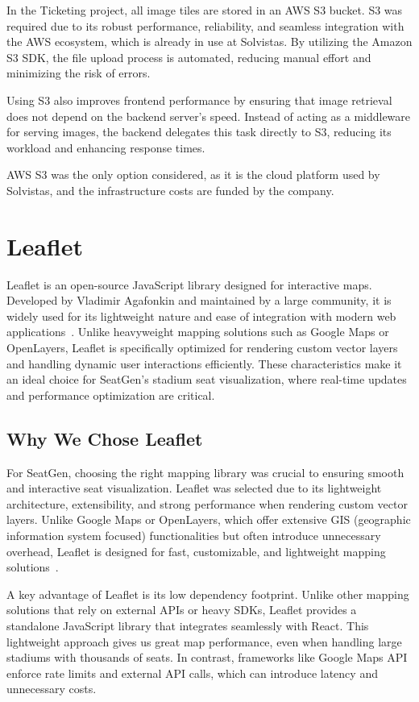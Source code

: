 In the Ticketing project, all image tiles are stored in an AWS S3 bucket. S3 was required due to its robust performance, reliability, and seamless integration with the AWS ecosystem, which is already in use at Solvistas. By utilizing the Amazon S3 SDK, the file upload process is automated, reducing manual effort and minimizing the risk of errors.

Using S3 also improves frontend performance by ensuring that image retrieval does not depend on the backend server’s speed. Instead of acting as a middleware for serving images, the backend delegates this task directly to S3, reducing its workload and enhancing response times.

AWS S3 was the only option considered, as it is the cloud platform used by Solvistas, and the infrastructure costs are funded by the company.

\section{Leaflet}
Leaflet is an open-source JavaScript library designed for interactive maps. Developed by Vladimir Agafonkin and maintained by a large community, it is widely used for its lightweight nature and ease of integration with modern web applications~\cite{Leaflet}. Unlike heavyweight mapping solutions such as Google Maps or OpenLayers, Leaflet is specifically optimized for rendering custom vector layers and handling dynamic user interactions efficiently. These characteristics make it an ideal choice for SeatGen’s stadium seat visualization, where real-time updates and performance optimization are critical.

\subsection{Why We Chose Leaflet}
For SeatGen, choosing the right mapping library was crucial to ensuring smooth and interactive seat visualization. Leaflet was selected due to its lightweight architecture, extensibility, and strong performance when rendering custom vector layers. Unlike Google Maps or OpenLayers, which offer extensive GIS (geographic information system focused) functionalities but often introduce unnecessary overhead, Leaflet is designed for fast, customizable, and lightweight mapping solutions~\cite{Leaflet}. 

A key advantage of Leaflet is its low dependency footprint. Unlike other mapping solutions that rely on external APIs or heavy SDKs, Leaflet provides a standalone JavaScript library that integrates seamlessly with React. This lightweight approach gives us great map performance, even when handling large stadiums with thousands of seats. In contrast, frameworks like Google Maps API enforce rate limits and external API calls, which can introduce latency and unnecessary costs.

